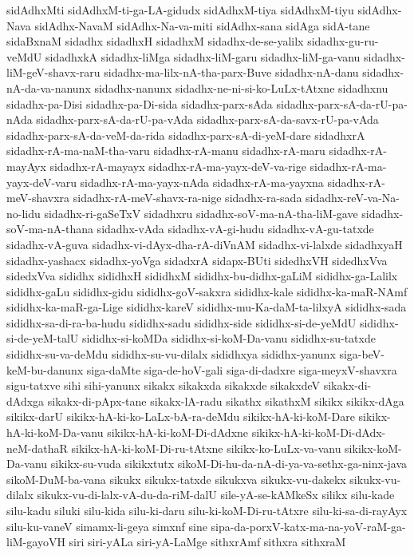{sidAdhxMti
sidAdhxM-ti-ga-LA-gidudx
sidAdhxM-tiya
sidAdhxM-tiyu
sidAdhx-Nava
sidAdhx-NavaM
sidAdhx-Na-va-miti
sidAdhx-sana
sidAga
sidA-tane
sidaBxnaM
sidadhx
sidadhxH
sidadhxM
sidadhx-de-se-yalilx
sidadhx-gu-ru-veMdU
sidadhxkA
sidadhx-liMga
sidadhx-liM-garu
sidadhx-liM-ga-vanu
sidadhx-liM-geV-shavx-raru
sidadhx-ma-lilx-nA-tha-parx-Buve
sidadhx-nA-danu
sidadhx-nA-da-va-nanunx
sidadhx-nanunx
sidadhx-ne-ni-si-ko-LuLx-tAtxne
sidadhxnu
sidadhx-pa-Disi
sidadhx-pa-Di-sida
sidadhx-parx-sAda
sidadhx-parx-sA-da-rU-pa-nAda
sidadhx-parx-sA-da-rU-pa-vAda
sidadhx-parx-sA-da-savx-rU-pa-vAda
sidadhx-parx-sA-da-veM-da-rida
sidadhx-parx-sA-di-yeM-dare
sidadhxrA
sidadhx-rA-ma-naM-tha-varu
sidadhx-rA-manu
sidadhx-rA-maru
sidadhx-rA-mayAyx
sidadhx-rA-mayayx
sidadhx-rA-ma-yayx-deV-va-rige
sidadhx-rA-ma-yayx-deV-varu
sidadhx-rA-ma-yayx-nAda
sidadhx-rA-ma-yayxna
sidadhx-rA-meV-shavxra
sidadhx-rA-meV-shavx-ra-nige
sidadhx-ra-sada
sidadhx-reV-va-Na-no-lidu
sidadhx-ri-gaSeTxV
sidadhxru
sidadhx-soV-ma-nA-tha-liM-gave
sidadhx-soV-ma-nA-thana
sidadhx-vAda
sidadhx-vA-gi-hudu
sidadhx-vA-gu-tatxde
sidadhx-vA-guva
sidadhx-vi-dAyx-dha-rA-diVnAM
sidadhx-vi-lalxde
sidadhxyaH
sidadhx-yashacx
sidadhx-yoVga
sidadxrA
sidapx-BUti
sidedhxVH
sidedhxVva
sidedxVva
sididhx
sididhxH
sididhxM
sididhx-bu-didhx-gaLiM
sididhx-ga-Lalilx
sididhx-gaLu
sididhx-gidu
sididhx-goV-sakxra
sididhx-kale
sididhx-ka-maR-NAmf
sididhx-ka-maR-ga-Lige
sididhx-kareV
sididhx-mu-Ka-daM-ta-lilxyA
sididhx-sada
sididhx-sa-di-ra-ba-hudu
sididhx-sadu
sididhx-side
sididhx-si-de-yeMdU
sididhx-si-de-yeM-talU
sididhx-si-koMDa
sididhx-si-koM-Da-vanu
sididhx-su-tatxde
sididhx-su-va-deMdu
sididhx-su-vu-dilalx
sididhxya
sididhx-yanunx
siga-beV-keM-bu-danunx
siga-daMte
siga-de-hoV-gali
siga-di-dadxre
siga-meyxV-shavxra
sigu-tatxve
sihi
sihi-yanunx
sikakx
sikakxda
sikakxde
sikakxdeV
sikakx-di-dAdxga
sikakx-di-pApx-tane
sikakx-lA-radu
sikathx
sikathxM
sikikx
sikikx-dAga
sikikx-darU
sikikx-hA-ki-ko-LaLx-bA-ra-deMdu
sikikx-hA-ki-koM-Dare
sikikx-hA-ki-koM-Da-vanu
sikikx-hA-ki-koM-Di-dAdxne
sikikx-hA-ki-koM-Di-dAdx-neM-dathaR
sikikx-hA-ki-koM-Di-ru-tAtxne
sikikx-ko-LuLx-va-vanu
sikikx-koM-Da-vanu
sikikx-su-vuda
sikikxtutx
sikoM-Di-hu-da-nA-di-ya-va-sethx-ga-ninx-java
sikoM-DuM-ba-vana
sikukx
sikukx-tatxde
sikukxva
sikukx-vu-dakekx
sikukx-vu-dilalx
sikukx-vu-di-lalx-vA-du-da-riM-dalU
sile-yA-se-kAMkeSx
silikx
silu-kade
silu-kadu
siluki
silu-kida
silu-ki-daru
silu-ki-koM-Di-ru-tAtxre
silu-ki-sa-di-rayAyx
silu-ku-vaneV
simamx-li-geya
simxnf
sine
sipa-da-porxV-katx-ma-na-yoV-raM-ga-liM-gayoVH
siri
siri-yALa
siri-yA-LaMge
sithxrAmf
sithxra
sithxraM
}
